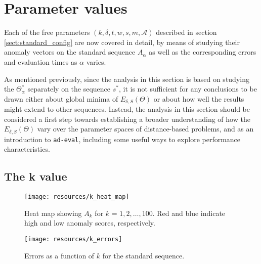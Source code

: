 \clearpage

\section{Parameter values}
\label{sect:params}

Each of the free parameters $(k, \delta, t, w, s, m, \mathcal{A})$ described in section \ref{sect:standard_config} are now covered in detail, by means of studying their anomaly vectors on the standard sequence $A_\alpha$ as well as the corresponding errors and evaluation times as $\alpha$ varies.

As mentioned previously, since the analysis in this section is based on studying the $\Theta_{\alpha}^*$ separately on the sequence $s^*$, it is not sufficient for any conclusions to be drawn either about global minima of $E_{\delta, S}(\Theta)$ or about how well the results might extend to other sequences. Instead, the analysis in this section should be considered a first step towards establishing a broader understanding of how the $E_{\delta, S}(\Theta)$ vary over the parameter spaces of distance-based problems, and as an introduction to \texttt{ad-eval}, including some useful ways to explore performance characteristics.

\subsection{The k value}
\FloatBarrier

\begin{figure}[h]
    \vspace{-10pt}
    \begin{center}
        \texttt{[image: resources/k\_heat\_map]}
    \end{center}
    \vspace{-20pt}
    \caption{\small{Heat map showing $A_k$ for $k$ = $1, 2, \dots, 100$. Red and blue indicate high and low anomaly scores, respectively.}}
    \label{fig:k_heat_map}
\end{figure}

\begin{wrapfigure}{r}{0.5\textwidth}
    \vspace{-30pt}
    \begin{center}
        \texttt{[image: resources/k\_errors]}
    \end{center}
    \vspace{-20pt}
    \caption{\small{Errors as a function of $k$ for the standard sequence.}}
    \label{fig:k_errors}
    \vspace{-10pt}
\end{wrapfigure}

